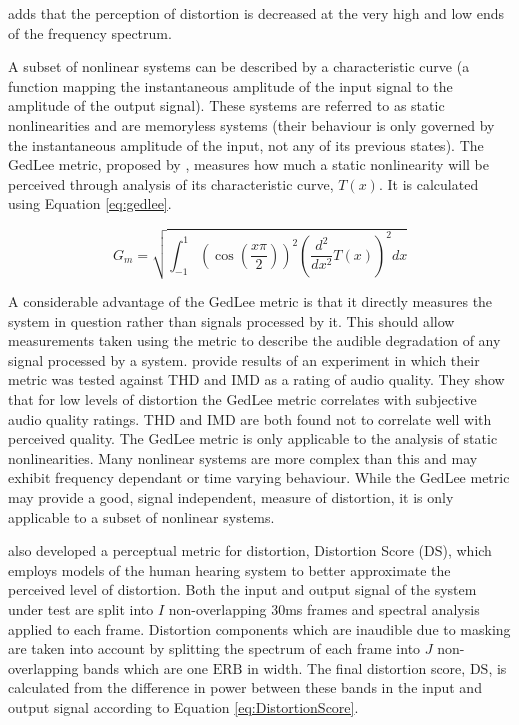 			\citet{voishvillo2006assessment} adds that the perception of distortion is decreased at the very
			high and low ends of the frequency spectrum.

			A subset of nonlinear systems can be described by a characteristic curve (a function mapping the
			instantaneous amplitude of the input signal to the amplitude of the output signal). These systems
			are referred to as static nonlinearities and are memoryless systems (their behaviour is only
			governed by the instantaneous amplitude of the input, not any of its previous states). The GedLee
			metric, proposed by \citet{geddes2003auditory}, measures how much a static nonlinearity will be
			perceived through analysis of its characteristic curve, $T(x)$. It is calculated using Equation
			\ref{eq:gedlee}.

			\begin{equation}
				G_{m} = \sqrt{\int_{-1}^{1} \left( \cos \left( \frac{x\pi}{2} \right) \right)^{2}
					      \left( \frac{d^{2}}{dx^{2}} T(x) \right)^{2} dx}
				\label{eq:gedlee}
			\end{equation}

			A considerable advantage of the GedLee metric is that it directly measures the system in question
			rather than signals processed by it. This should allow measurements taken using the metric to
			describe the audible degradation of any signal processed by a system. \citet{lee2003auditory}
			provide results of an experiment in which their metric was tested against THD and IMD as a rating of
			audio quality. They show that for low levels of distortion the GedLee metric correlates with
			subjective audio quality ratings. THD and IMD are both found not to correlate well with perceived
			quality. The GedLee metric is only applicable to the analysis of static nonlinearities. Many
			nonlinear systems are more complex than this and may exhibit frequency dependant or time varying
			behaviour. While the GedLee metric may provide a good, signal independent, measure of distortion, it
			is only applicable to a subset of nonlinear systems.

			\citet{tan2003the} also developed a perceptual metric for distortion, Distortion Score
			($\mathrm{DS}$), which employs models of the human hearing system to better approximate the
			perceived level of distortion.  Both the input and output signal of the system under test are split
			into $I$ non-overlapping 30ms frames and spectral analysis applied to each frame. Distortion
			components which are inaudible due to masking are taken into account by splitting the spectrum of
			each frame into $J$ non-overlapping bands which are one $\mathrm{ERB}$ in width. The final
			distortion score, $\mathrm{DS}$, is calculated from the difference in power between these bands in
			the input and output signal according to Equation \ref{eq:DistortionScore}.

